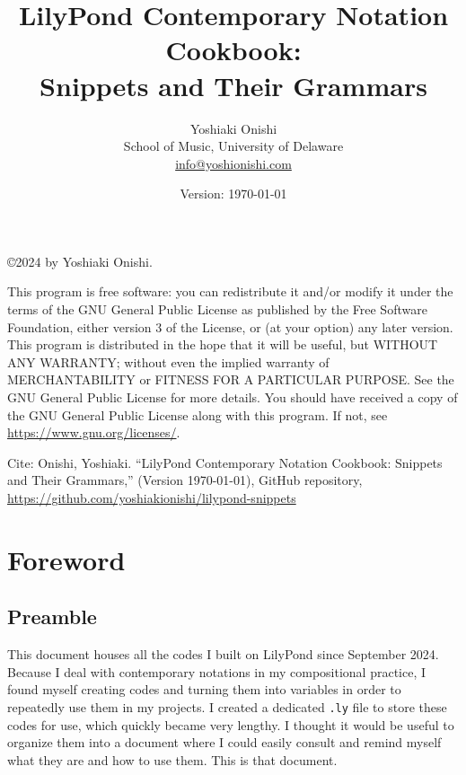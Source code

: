 \documentclass[11pt, oneside]{book}   	%
\title{LilyPond Contemporary Notation Cookbook: \\ Snippets and Their Grammars}
\author{Yoshiaki Onishi\\School of Music, University of Delaware \\ \href{mailto:info@yoshionishi.com}{info@yoshionishi.com}}
\date{Version: \today}
\begin{document}
\maketitle




\copyright 2024 by Yoshiaki Onishi. 
\hfill \break
\break

This program is free software: you can redistribute it and/or modify it under the terms of the GNU General Public License as published by the Free Software Foundation, either version 3 of the License, or (at your option) any later version.
\hfill \break
\break
This program is distributed in the hope that it will be useful, but WITHOUT ANY WARRANTY; without even the implied warranty of MERCHANTABILITY or FITNESS FOR A PARTICULAR PURPOSE. See the GNU General Public License for more details.
\hfill \break
\break
You should have received a copy of the GNU General Public License along with this program. If not, see  \href{https://www.gnu.org/licenses/}{https://www.gnu.org/licenses/}.

\hfill \break
\break
Cite: Onishi, Yoshiaki. “LilyPond Contemporary Notation Cookbook: Snippets and Their Grammars,” (Version \today), GitHub repository, \href{https://github.com/yoshiakionishi/lilypond-snippets}{https://github.com/yoshiakionishi/lilypond-snippets}\\ %


\frontmatter
\tableofcontents
\label{sec:toc}
\clearpage
\vfill \break


\chapter{Foreword}
\section{Preamble}
This document houses all the codes I built on LilyPond since September 2024. Because I deal with contemporary notations in my compositional practice, I found myself creating codes and turning them into variables in order to repeatedly use them in my projects. I created a dedicated \verb|.ly| file to store these codes for use, which quickly became very lengthy. I thought it would be useful to organize them into a document where I could easily consult and remind myself what they are and how to use them. This is that document.
\end{document}
